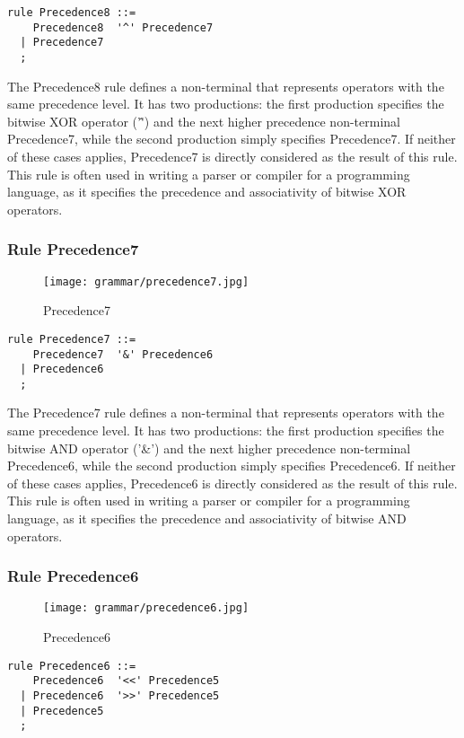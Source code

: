 \begin{lstlisting}
rule Precedence8 ::=
    Precedence8  '^' Precedence7 
  | Precedence7 
  ;
\end{lstlisting}

The Precedence8 rule defines a non-terminal that represents operators with the same precedence level. It has two productions: the first production specifies the bitwise XOR operator ('\^') and the next higher precedence non-terminal Precedence7, while the second production simply specifies Precedence7. If neither of these cases applies, Precedence7 is directly considered as the result of this rule. This rule is often used in writing a parser or compiler for a programming language, as it specifies the precedence and associativity of bitwise XOR operators.

\subsubsection*{Rule Precedence7}

\begin{figure}[!ht]
\centering
\texttt{[image: grammar/precedence7.jpg]}
\caption{Precedence7}
\end{figure}

\begin{lstlisting}
rule Precedence7 ::=
    Precedence7  '&' Precedence6 
  | Precedence6 
  ;
\end{lstlisting}

The Precedence7 rule defines a non-terminal that represents operators with the same precedence level. It has two productions: the first production specifies the bitwise AND operator ('\&') and the next higher precedence non-terminal Precedence6, while the second production simply specifies Precedence6. If neither of these cases applies, Precedence6 is directly considered as the result of this rule. This rule is often used in writing a parser or compiler for a programming language, as it specifies the precedence and associativity of bitwise AND operators.

\subsubsection*{Rule Precedence6}

\begin{figure}[!ht]
\centering
\texttt{[image: grammar/precedence6.jpg]}
\caption{Precedence6}
\end{figure}

\begin{lstlisting}
rule Precedence6 ::=
    Precedence6  '<<' Precedence5 
  | Precedence6  '>>' Precedence5 
  | Precedence5 
  ;
\end{lstlisting}

